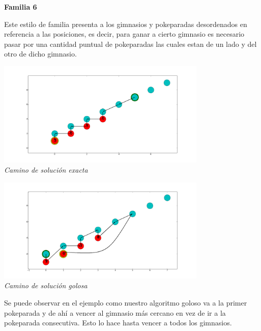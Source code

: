 \begin{center}
\textbf{Familia 6}
\end{center}

Este estilo de familia presenta a los gimnasios y pokeparadas desordenados en referencia a las posiciones, es decir, para ganar a cierto gimnasio es necesario pasar por una cantidad puntual de pokeparadas las cuales estan de un lado y del otro de dicho gimnasio.



\vspace*{0.3cm} \vspace*{0.3cm}
  \begin{center}
 \includegraphics[width=0.75\textwidth]{./EJ2/caminosinorden1.png}
\\{\textit{Camino de solución exacta }}
   
  \end{center}
  \vspace*{0.3cm}


\vspace*{0.3cm} \vspace*{0.3cm}
  \begin{center}
    \includegraphics[width=0.75\textwidth]{./EJ2/caminosinorden.png}
\\{\textit{Camino de solución golosa }}
   
  \end{center}
  \vspace*{0.3cm}

Se puede observar en el ejemplo como nuestro algoritmo goloso va a la primer pokeparada y de ah\'i a vencer al gimnasio m\'as cercano en vez de ir a la pokeparada consecutiva. Esto lo hace hasta vencer a todos los gimnasios.

